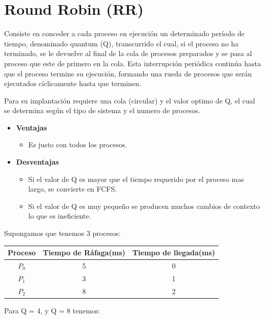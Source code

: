 \documentclass{article}
\begin{document}
{\centering \section{Round Robin (RR)}}

Consiste en conceder a cada proceso en ejecución un determinado período de tiempo, denominado quantum (Q), transcurrido el cual,
si el proceso no ha terminado, se le devuelve al final de la cola de procesos preparados y se pasa al proceso
que este de primero en la cola.
Esta interrupción periódica continúa hasta que el proceso termine su ejecución, formando una rueda de procesos que 
serán ejecutados cíclicamente hasta que terminen.

Para su implantación requiere una cola (circular) y el valor optimo de Q, el cual se determina según
el tipo de sistema y el numero de procesos.

\begin{itemize}
	\item \textbf{Ventajas}
	\begin{itemize}
		\item Es justo con todos los procesos.
	\end{itemize}
	
	\item \textbf{Desventajas}
	\begin{itemize}
		\item Si el valor de Q es mayor que el tiempo requerido 
		por el proceso mas largo, se convierte en FCFS.
		\item Si el valor de Q es muy pequeño se producen muchos
		cambios de contexto lo que es ineficiente.
	\end{itemize}
\end{itemize}

Supongamos que tenemos 3 procesos:
\begin{center}
	\begin{tabular}{|c|c|c|} \hline
		Proceso & Tiempo de Ráfaga(ms) & Tiempo de llegada(ms) \\ \hline
		$P_{0}$ & 5 & 0 \\
		$P_{1}$ & 3 & 1 \\
		$P_{2}$ & 8 & 2 \\ \hline
	\end{tabular}
\end{center}

Para Q = 4,  y Q = 8 tenemos:

\vspace{0.4cm}
\end{document}
